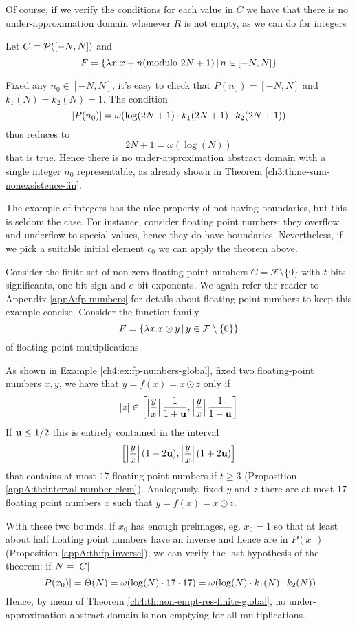 Of course, if we verify the conditions for each value in $C$ we have that there is no under-approximation domain whenever $R$ is not empty, as we can do for integers
\begin{example}
	Let $C = \mathcal{P}([-N, N])$ and
	\[
	F = \{ \lambda x. x + n (\text{modulo } 2N+1) \,\vert\, n \in [-N, N] \}
	\]

	Fixed any $n_0 \in [-N, N]$, it's easy to check that $P(n_0) = [-N, N]$ and $k_1(N) = k_2(N) = 1$. The condition
	\[
	\lvert P(n_0)\rvert = \omega(\log(2N + 1) \cdot k_1(2N + 1) \cdot k_2(2N + 1))
	\]
	thus reduces to
	\[
	2N + 1 = \omega(\log(N))
	\]
	that is true. Hence there is no under-approximation abstract domain with a single integer $n_0$ representable, as already shown in Theorem \ref{ch3:th:ne-sum-nonexsistence-fin}.
\end{example}
The example of integers has the nice property of not having boundaries, but this is seldom the case. For instance, consider floating point numbers: they overflow and underflow to special values, hence they do have boundaries. Nevertheless, if we pick a suitable initial element $c_0$ we can apply the theorem above.

\begin{example}
	Consider the finite set of non-zero floating-point numbers $C = \mathcal{F} \setminus \{ 0 \}$ with $t$ bits significants, one bit sign and $e$ bit exponents. We again refer the reader to Appendix \ref{appA:fp-numbers} for details about floating point numbers to keep this example concise.
	Consider the function family
	\[
	F = \{ \lambda x . x \odot y \,\vert\, y \in \mathcal{F} \setminus \{ 0 \} \}
	\]
	of floating-point multiplications.

	As shown in Example \ref{ch4:ex:fp-numbers-global}, fixed two floating-point numbers $x, y$, we have that $y = f(x) = x \odot z$ only if
	\[
	\lvert z\rvert \in \left[ \left\lvert\frac{y}{x}\right\rvert \frac{1}{1+\textbf{u}}, \left\lvert\frac{y}{x}\right\rvert \frac{1}{1-\textbf{u}} \right]
	\]
	If $\textbf{u} \le 1 / 2$ this is entirely contained in the interval
	\[
	\left[ \left\lvert\frac{y}{x}\right\rvert (1 - 2 \textbf{u}), \left\lvert\frac{y}{x}\right\rvert (1 + 2 \textbf{u}) \right]
	\]
	that contains at most $17$ floating point numbers if $t \ge 3$ (Proposition \ref{appA:th:interval-number-elem}).
	Analogously, fixed $y$ and $z$ there are at most $17$ floating point numbers $x$ such that $y = f(x) = x \odot z$.

	With these two bounds, if $x_0$ has enough preimages, eg. $x_0 = 1$ so that at least about half floating point numbers have an inverse and hence are in $P(x_0)$ (Proposition \ref{appA:th:fp-inverse}), we can verify the last hypothesis of the theorem: if $N = \lvert C\rvert$
	\[
	\lvert P(x_0)\rvert = \Theta(N) = \omega(\log(N) \cdot 17 \cdot 17) = \omega(\log(N) \cdot k_1(N) \cdot k_2(N))
	\]
	Hence, by mean of Theorem \ref{ch4:th:non-empt-res-finite-global}, no under-approximation abstract domain is non emptying for all multiplications.
\end{example}
